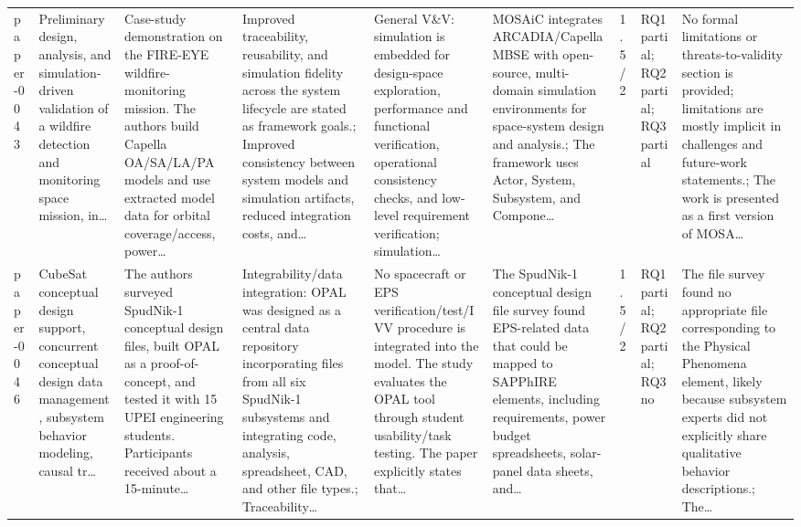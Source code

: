\documentclass[10pt]{article}
\begin{document}
\begin{landscape}
\begin{longtable}{p{1.0cm}p{2.4cm}p{3.1cm}p{3.7cm}p{3.4cm}p{3.1cm}p{1.0cm}p{1.8cm}p{3.4cm}}
paper-0043 & Preliminary design, analysis, and simulation-driven validation of a wildfire detection and monitoring space mission, in… & Case-study demonstration on the FIRE-EYE wildfire-monitoring mission. The authors build Capella OA/SA/LA/PA models and use extracted model data for orbital coverage/access, power… & Improved traceability, reusability, and simulation fidelity across the system lifecycle are stated as framework goals.; Improved consistency between system models and simulation artifacts, reduced integration costs, and… & General V\&V: simulation is embedded for design-space exploration, performance and functional verification, operational consistency checks, and low-level requirement verification; simulation… & MOSAiC integrates ARCADIA/Capella MBSE with open-source, multi-domain simulation environments for space-system design and analysis.; The framework uses Actor, System, Subsystem, and Compone… & 1.5/2 & RQ1 partial; RQ2 partial; RQ3 partial & No formal limitations or threats-to-validity section is provided; limitations are mostly implicit in challenges and future-work statements.; The work is presented as a first version of MOSA… \\
paper-0046 & CubeSat conceptual design support, concurrent conceptual design data management, subsystem behavior modeling, causal tr… & The authors surveyed SpudNik-1 conceptual design files, built OPAL as a proof-of-concept, and tested it with 15 UPEI engineering students. Participants received about a 15-minute… & Integrability/data integration: OPAL was designed as a central data repository incorporating files from all six SpudNik-1 subsystems and integrating code, analysis, spreadsheet, CAD, and other file types.; Traceability… & No spacecraft or EPS verification/test/IVV procedure is integrated into the model. The study evaluates the OPAL tool through student usability/task testing. The paper explicitly states that… & The SpudNik-1 conceptual design file survey found EPS-related data that could be mapped to SAPPhIRE elements, including requirements, power budget spreadsheets, solar-panel data sheets, and… & 1.5/2 & RQ1 partial; RQ2 partial; RQ3 no & The file survey found no appropriate file corresponding to the Physical Phenomena element, likely because subsystem experts did not explicitly share qualitative behavior descriptions.; The… \\

\end{longtable}
\end{landscape}
\end{document}
